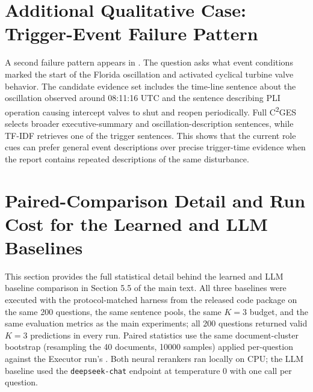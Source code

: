 \documentclass[11pt,letterpaper]{article}
\newcommand{\cges}{C\textsuperscript{2}GES}
\begin{document}
\section{Additional Qualitative Case: Trigger-Event Failure Pattern}
\label{sec:s5}

A second failure pattern appears in . The question asks what event conditions marked the start of the Florida oscillation and activated cyclical turbine valve behavior. The candidate evidence set includes the time-line sentence about the oscillation observed around 08:11:16 UTC and the sentence describing PLI operation causing intercept valves to shut and reopen periodically. Full \cges{} selects broader executive-summary and oscillation-description sentences, while TF-IDF retrieves one of the trigger sentences. This shows that the current role cues can prefer general event descriptions over precise trigger-time evidence when the report contains repeated descriptions of the same disturbance.

\section{Paired-Comparison Detail and Run Cost for the Learned and LLM Baselines}
\label{sec:s6}

This section provides the full statistical detail behind the learned and LLM baseline comparison in Section 5.5 of the main text. All three baselines were executed with the protocol-matched harness from the released code package on the same 200 questions, the same sentence pools, the same $K=3$ budget, and the same evaluation metrics as the main experiments; all 200 questions returned valid $K=3$ predictions in every run. Paired statistics use the same document-cluster bootstrap (resampling the 40 documents, 10000 samples) applied per-question against the Executor run's . Both neural rerankers ran locally on CPU; the LLM baseline used the \texttt{deepseek-chat} endpoint at temperature 0 with one call per question.
\end{document}
